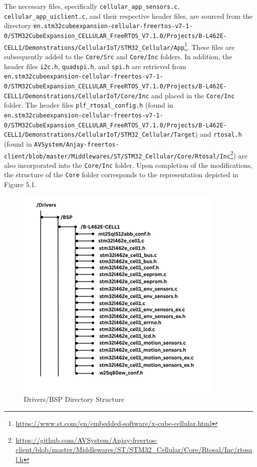 \begin{sloppypar}
The necessary files, specifically \lstinline{cellular_app_sensors.c}, \lstinline{cellular_app_uiclient.c}, and their respective header files, are sourced from the directory \lstinline{en.stm32cubeexpansion-cellular-freertos-v7-1-0/STM32CubeExpansion_CELLULAR_FreeRTOS_V7.1.0/Projects/B-L462E-CELL1/Demonstrations/CellularIoT/STM32_Cellular/App}\footnote{\url{https://www.st.com/en/embedded-software/x-cube-cellular.html}}. These files are subsequently added to the \lstinline{Core/Src} and \lstinline{Core/Inc} folders. In addition, the header files \lstinline{i2c.h}, \lstinline{quadspi.h}, and \lstinline{spi.h} are retrieved from \lstinline{en.stm32cubeexpansion-cellular-freertos-v7-1-0/STM32CubeExpansion_CELLULAR_FreeRTOS_V7.1.0/Projects/B-L462E-CELL1/Demonstrations/CellularIoT/Core/Inc} and placed in the \lstinline{Core/Inc} folder. The header files \lstinline{plf_rtosal_config.h} (found in \lstinline{en.stm32cubeexpansion-cellular-freertos-v7-1-0/STM32CubeExpansion_CELLULAR_FreeRTOS_V7.1.0/Projects/B-L462E-CELL1/Demonstrations/CellularIoT/STM32_Cellular/Target}) and \lstinline{rtosal.h} (found in \lstinline{AVSystem/Anjay-freertos-client/blob/master/Middlewares/ST/STM32_Cellular/Core/Rtosal/Inc}\footnote{\url{https://github.com/AVSystem/Anjay-freertos-client/blob/master/Middlewares/ST/STM32_Cellular/Core/Rtosal/Inc/rtosal.h}}) are also incorporated into the \lstinline{Core/Inc} folder.
Upon completion of the modifications, the structure of the \lstinline{Core} folder corresponds to the representation depicted in Figure 5.1.
\end{sloppypar}

\begin{figure}[H]
    \centering
    \includegraphics[width=0.5\linewidth]{Drivers_BSP.png}
    \caption{Drivers/BSP Directory Structure}
    \label{fig:Drivers/BSP Directory Structure}
\end{figure}

